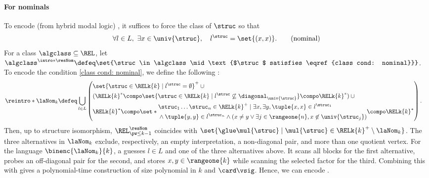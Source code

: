 \paragraph*{For nominals}
To encode \intro*{} (from hybrid modal logic) \cite{arecesHybridLogics2007}, it suffices to force the class of  $\struc$
so that
\begin{align*}
\forall l \in L,\ \exists x \in \univ{\struc},\quad
l^{\struc} = \set{(x,x)}. \tag{nominal}\label{class cond: nominal}
\end{align*}
\AP
For a class $\algclass \subseteq \REL$,
let $\algclass^{\intro*\resNom} \defeq \set{\struc \in \algclass \mid \text{$\struc$ satisfies \eqref{class cond: nominal}}}$.
To encode the condition \eqref{class cond: nominal}, we define the following :
\AP
{}
\begin{align*}
    \reintro*\laNom_{k} &\defeq
    \bigcup_{l \in L}
    \left(\begin{aligned}
       & \set{\struc \in \RELk{k} \mid l^{\struc} = \emptyset}^{+} \cup {} \\
       & (\RELk{k}^{*} \compo \set{\struc \in \RELk{k} \mid l^{\struc} \not\subseteq \diagonal_{\univ{\struc}}} \compo \RELk{k}^{*}) \cup {} \\
       & \RELk{k}^{*} \compo \set*{
            \begin{aligned}
                &\struc_1 \dots \struc_{n} \in \RELk{k}^{+} \mid \exists x, \exists y, \tuple{x, x} \in l^{\struc_1}   \\
                &{} \land \tuple{y, y} \in l^{\struc_n} \land  (x \neq y \lor \exists j \in \rangeone{n}, x \not\in \univ{\struc_{j}})
            \end{aligned}} \compo \RELk{k}^{*}
    \end{aligned}\right).
\end{align*}
Then, up to structure isomorphism, $\REL^{\resNom}_{\pw \le k-1}$ coincides with
$\set{\glue \mul{\struc} \mid \mul{\struc} \in \RELk{k}^{+} \setminus \laNom_{k}}$.
The three alternatives in $\laNom_k$ exclude, respectively, an empty interpretation, a non-diagonal pair, and more than one quotient vertex.
For the language $\binenc{\laNom_{k}}{k}$,
a  guesses $l\in L$ and one of the three alternatives above.
It scans all blocks for the first alternative, probes an off-diagonal pair for the second,
and stores $x,y\in\rangeone{k}$ while scanning the selected factor for the third.
Combining this with  gives a polynomial-time construction
of size polynomial in $k$ and $\card\vsig$.
Hence, we can encode .

